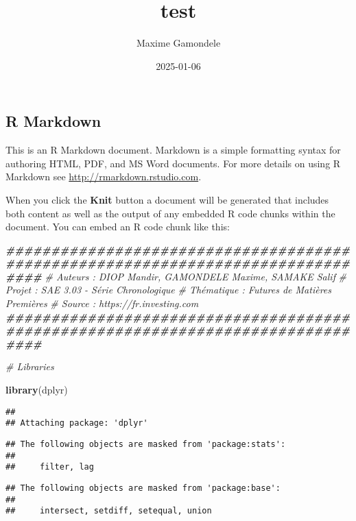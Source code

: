 \documentclass[
]{article}
\title{test}
\author{Maxime Gamondele}
\date{2025-01-06}
\newenvironment{Shaded}{\begin{snugshade}}{\end{snugshade}}
\newcommand{\CommentTok}[1]{\textcolor[rgb]{0.56,0.35,0.01}{\textit{#1}}}
\newcommand{\DocumentationTok}[1]{\textcolor[rgb]{0.56,0.35,0.01}{\textbf{\textit{#1}}}}
\newcommand{\FunctionTok}[1]{\textcolor[rgb]{0.13,0.29,0.53}{\textbf{#1}}}
\newcommand{\NormalTok}[1]{#1}
\begin{document}
\maketitle

\subsection{R Markdown}\label{r-markdown}

This is an R Markdown document. Markdown is a simple formatting syntax
for authoring HTML, PDF, and MS Word documents. For more details on
using R Markdown see \url{http://rmarkdown.rstudio.com}.

When you click the \textbf{Knit} button a document will be generated
that includes both content as well as the output of any embedded R code
chunks within the document. You can embed an R code chunk like this:

\begin{Shaded}
\begin{Highlighting}[]
\DocumentationTok{\#\#\#\#\#\#\#\#\#\#\#\#\#\#\#\#\#\#\#\#\#\#\#\#\#\#\#\#\#\#\#\#\#\#\#\#\#\#\#\#\#\#\#\#\#\#\#\#\#\#\#\#\#\#\#\#\#\#\#\#\#\#\#\#\#\#\#\#\#\#\#\#\#\#\#\#\#\#\#\#}
\CommentTok{\# Auteurs     : DIOP Mandir, GAMONDELE Maxime, SAMAKE Salif}
\CommentTok{\# Projet      : SAE 3.03 {-} Série Chronologique}
\CommentTok{\# Thématique  : Futures de Matières Premières}
\CommentTok{\# Source      : https://fr.investing.com}
\DocumentationTok{\#\#\#\#\#\#\#\#\#\#\#\#\#\#\#\#\#\#\#\#\#\#\#\#\#\#\#\#\#\#\#\#\#\#\#\#\#\#\#\#\#\#\#\#\#\#\#\#\#\#\#\#\#\#\#\#\#\#\#\#\#\#\#\#\#\#\#\#\#\#\#\#\#\#\#\#\#\#\#\#}

\CommentTok{\# Libraries}

\FunctionTok{library}\NormalTok{(dplyr)   }
\end{Highlighting}
\end{Shaded}

\begin{verbatim}
## 
## Attaching package: 'dplyr'
\end{verbatim}

\begin{verbatim}
## The following objects are masked from 'package:stats':
## 
##     filter, lag
\end{verbatim}

\begin{verbatim}
## The following objects are masked from 'package:base':
## 
##     intersect, setdiff, setequal, union
\end{verbatim}
\end{document}
